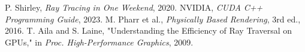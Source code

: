 \documentclass[conference]{IEEEtran}
\begin{document}


\begin{thebibliography}{00}
 P. Shirley, \textit{Ray Tracing in One Weekend}, 2020.
 NVIDIA, \textit{CUDA C++ Programming Guide}, 2023.
 M. Pharr et al., \textit{Physically Based Rendering}, 3rd ed., 2016.
 T. Aila and S. Laine, "Understanding the Efficiency of Ray Traversal on GPUs," in \textit{Proc. High-Performance Graphics}, 2009.
\end{thebibliography}
\end{document}
